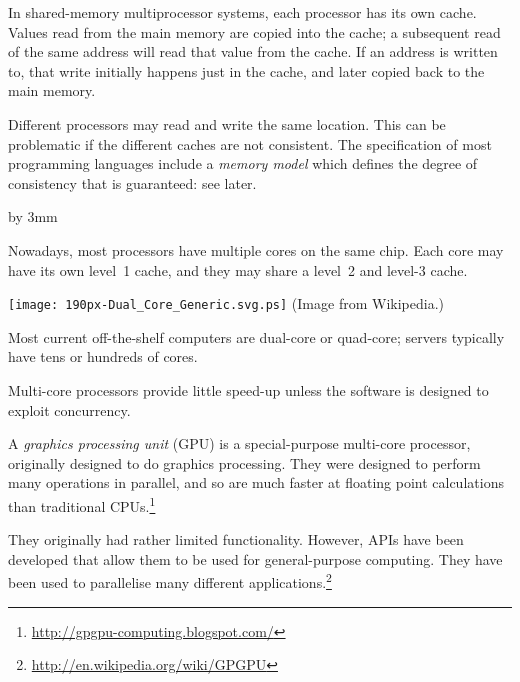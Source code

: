 \documentclass[notes,color]{sepslide0}
\begin{document}

\begin{slide}

In shared-memory multiprocessor systems, each processor has its own cache.
Values read from the main memory are copied into the cache; a subsequent read
of the same address will read that value from the cache.  If an address is
written to, that write initially happens just in the cache, and later copied
back to the main memory.

Different processors may read and write the same location.  This can be
problematic if the different caches are not consistent.  The specification of
most programming languages include a \emph{memory model} which defines the
degree of consistency that is guaranteed: see later.

\end{slide}


{\advance\slideheight by 3mm
\begin{slide}

Nowadays, most processors have multiple cores on the same chip.  Each core may
have its own level~1 cache, and they may share a level~2  and level-3 cache.
%
\begin{center}
\texttt{[image: 190px-Dual\_Core\_Generic.svg.ps]} \hspace{2cm}
(Image from Wikipedia.)
\end{center}

Most current off-the-shelf computers are dual-core or quad-core; servers
typically have tens or hundreds of cores.

Multi-core processors provide little speed-up unless the software is designed
to exploit concurrency.
\end{slide}}


\begin{slide}

A \emph{graphics processing unit} (GPU) is a special-purpose multi-core
processor, originally designed to do graphics processing.  They were designed
to perform many operations in parallel, and so are much faster at floating
point calculations than traditional
CPUs.\footnote{\url{http://gpgpu-computing.blogspot.com/}} 

They originally had rather limited functionality.  However, APIs have
been developed that allow them to be used for general-purpose computing.  They
have been used to parallelise many different
applications.\footnote{\url{http://en.wikipedia.org/wiki/GPGPU}} 

\vfill
\end{slide}
\end{document}

